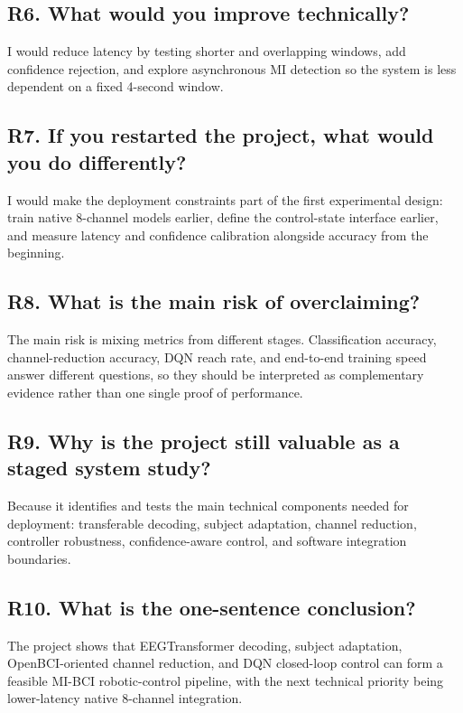 \documentclass[11pt]{article}
\begin{document}
\subsection*{R6. What would you improve technically?}
I would reduce latency by testing shorter and overlapping windows, add confidence rejection, and explore asynchronous MI detection so the system is less dependent on a fixed 4-second window.


\subsection*{R7. If you restarted the project, what would you do differently?}
I would make the deployment constraints part of the first experimental design: train native 8-channel models earlier, define the control-state interface earlier, and measure latency and confidence calibration alongside accuracy from the beginning.


\subsection*{R8. What is the main risk of overclaiming?}
The main risk is mixing metrics from different stages. Classification accuracy, channel-reduction accuracy, DQN reach rate, and end-to-end training speed answer different questions, so they should be interpreted as complementary evidence rather than one single proof of performance.


\subsection*{R9. Why is the project still valuable as a staged system study?}
Because it identifies and tests the main technical components needed for deployment: transferable decoding, subject adaptation, channel reduction, controller robustness, confidence-aware control, and software integration boundaries.


\subsection*{R10. What is the one-sentence conclusion?}
The project shows that EEGTransformer decoding, subject adaptation, OpenBCI-oriented channel reduction, and DQN closed-loop control can form a feasible MI-BCI robotic-control pipeline, with the next technical priority being lower-latency native 8-channel integration.
\end{document}
